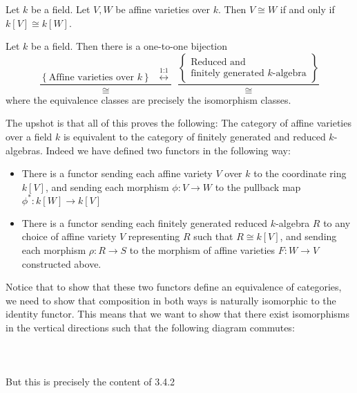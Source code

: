 \documentclass[a4paper]{article}
\begin{document}
\begin{prp}{}{} Let $k$ be a field. Let $V,W$ be affine varieties over $k$. Then $V\cong W$ if and only if $k[V]\cong k[W]$. 
\end{prp}

\begin{crl}{}{} Let $k$ be a field. Then there is a one-to-one bijection $$\frac{\left\{\text{Affine varieties over }k\right\}\;\;\overset{\text{1:1}}{\longleftrightarrow}}{\cong}\;\;\frac{\left\{\substack{\text{Reduced and }\\\text{finitely generated }k\text{-algebra}}\right\}}{\cong}$$ where the equivalence classes are precisely the isomorphism classes. 
\end{crl}


The upshot is that all of this proves the following: The category of affine varieties over a field $k$ is equivalent to the category of finitely generated and reduced $k$-algebras. Indeed we have defined two functors in the following way:
\begin{itemize}
\item There is a functor sending each affine variety $V$ over $k$ to the coordinate ring $k[V]$, and sending each morphism $\phi:V\to W$ to the pullback map $\phi^\ast:k[W]\to k[V]$
\item There is a functor sending each finitely generated reduced $k$-algebra $R$ to any choice of affine variety $V$ representing $R$ such that $R\cong k[V]$, and sending each morphism $\rho:R\to S$ to the morphism of affine varieties $F:W\to V$ constructed above. 
\end{itemize}

Notice that to show that these two functors define an equivalence of categories, we need to show that composition in both ways is naturally isomorphic to the identity functor. This means that we want to show that there exist isomorphisms in the vertical directions such that the following diagram commutes: \\~\\
 \\~\\
But this is precisely the content of 3.4.2
 
\end{document}
